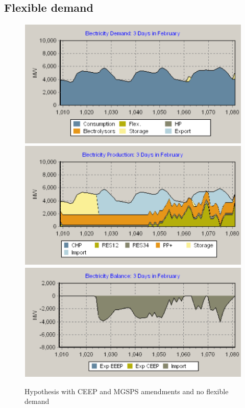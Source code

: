 \clearpage
\begin{appendices}

\section{Flexible demand} \label{app:flex_dem}

  \begin{figure}[htbp]
    \centering
    \centering
    \includegraphics[scale=1.4]{figures/B14-3day-demand.png}
    \includegraphics[scale=1.4]{figures/B14-3day-production.png}
    \includegraphics[scale=1.4]{figures/B14-3day-balance.png}
    \caption{Hypothesis with CEEP and MGSPS amendments and no flexible demand}
    \label{app:B14}
  \end{figure}


\end{appendices}
